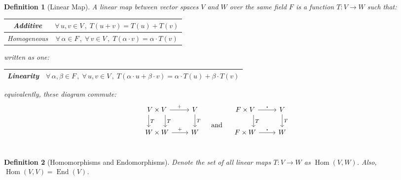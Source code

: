 \documentclass[12pt]{article}
\newcommand{\Forall}[1]{\forall\,{#1}\,,\;}
\DeclareMathOperator{\Hom}{Hom}
\newtheorem{definition}{Definition}[subsection]
\begin{document}
\begin{definition}[Linear Map]
  A linear map between vector spaces $V$ and $W$ over the same field $F$ is a function $T: V\to W$ such that:
  \begin{table}[H]
    \centering
    \begin{tabular}{|c|c|}\hline
      Additive & $\Forall{u,v\in V}T(u+ v)=T(u)+ T(v)$ \\\hline
      Homogeneous & $\Forall{\alpha\in F}\Forall{v\in V} T(\alpha\cdot v)=\alpha\cdot T(v)$\\\hline
    \end{tabular}
  \end{table}

  written as one:
  \begin{table}[H]
    \centering
    \begin{tabular}{|c|c|}\hline
      Linearity & $\Forall{\alpha,\beta\in F}\Forall{u,v\in V} T(\alpha\cdot u+ \beta\cdot v)=\alpha\cdot T(u)+ \beta\cdot T(v)$ \\\hline
    \end{tabular}
  \end{table}

  equivalently, these diagram commute:
  $$
  \begin{tikzcd}
    V \times V \arrow[shift right=12pt]{d}{T} \arrow[shift left=12pt]{d}{T}\arrow{r}{+}
    & V \arrow{d}{T}\\
    W \times W \arrow{r}{+}
    & W \\
  \end{tikzcd}
  \quad\text{ and }\quad
  \begin{tikzcd}
    F \times V \arrow[shift left=12pt]{d}{T}\arrow{r}{\bigcdot}
    & V \arrow{d}{T}\\
    F \times W \arrow{r}{\bigcdot}
    & W \\
  \end{tikzcd}
  $$
\end{definition}

\begin{definition}[Homomorphisms and Endomorphisms]
  Denote the set of all linear maps $T: V\to W$ as $\Hom(V, W)$. Also, $\Hom(V, V)=\operatorname{End}(V)$.
\end{definition}
\end{document}
